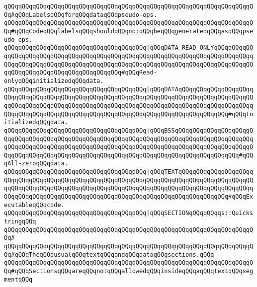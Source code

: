 \verb|qQQqqQQqqQQqqQQqqQQqqQQqqQQqqQQqqQQqqQQqqQQqqQQqqQQqqQQqqQQqqQQqqQQqqQQq#qQQqLabelsqQQqforqQQqdataqQQqpseudo-ops.|\newline
\verb|qQQqqQQqqQQqqQQqqQQqqQQqqQQqqQQqqQQqqQQqqQQqqQQqqQQqqQQqqQQqqQQqqQQqqQQq#qQQqCodeqQQqlabelsqQQqshouldqQQqnotqQQqbeqQQqgeneratedqQQqasqQQqpseudo-ops.|\newline
\newline
\verb|qQQqqQQqqQQqqQQqqQQqqQQqqQQqqQQqqQQqqQQq|\verb#|qQQqDATA_READ_ONLYqQQqqQQqqQQqqQQqqQQqqQQqqQQqqQQqqQQqqQQqqQQqqQQqqQQqqQQqqQQqqQQqqQQqqQQqqQQqqQQqqQQqqQQqqQQqqQQqqQQqqQQqqQQqqQQqqQQqqQQqqQQqqQQqqQQqqQQqqQQqqQQqqQQqqQQqqQQqqQQqqQQqqQQqqQQqqQQqqQQqqQQq#\verb|#qQQqRead-onlyqQQqinitializedqQQqdata.|\newline
\verb|qQQqqQQqqQQqqQQqqQQqqQQqqQQqqQQqqQQqqQQq|\verb#|qQQqDATAqQQqqQQqqQQqqQQqqQQqqQQqqQQqqQQqqQQqqQQqqQQqqQQqqQQqqQQqqQQqqQQqqQQqqQQqqQQqqQQqqQQqqQQqqQQqqQQqqQQqqQQqqQQqqQQqqQQqqQQqqQQqqQQqqQQqqQQqqQQqqQQqqQQqqQQqqQQqqQQqqQQqqQQqqQQqqQQqqQQqqQQqqQQqqQQqqQQqqQQqqQQqqQQqqQQqqQQqqQQqqQQq#\verb|#qQQqInitializedqQQqdata.|\newline
\verb|qQQqqQQqqQQqqQQqqQQqqQQqqQQqqQQqqQQqqQQq|\verb#|qQQqBSSqQQqqQQqqQQqqQQqqQQqqQQqqQQqqQQqqQQqqQQqqQQqqQQqqQQqqQQqqQQqqQQqqQQqqQQqqQQqqQQqqQQqqQQqqQQqqQQqqQQqqQQqqQQqqQQqqQQqqQQqqQQqqQQqqQQqqQQqqQQqqQQqqQQqqQQqqQQqqQQqqQQqqQQqqQQqqQQqqQQqqQQqqQQqqQQqqQQqqQQqqQQqqQQqqQQqqQQqqQQqqQQqqQQq#\verb|#qQQqAll-zeroqQQqdata.|\newline
\verb|qQQqqQQqqQQqqQQqqQQqqQQqqQQqqQQqqQQqqQQq|\verb#|qQQqTEXTqQQqqQQqqQQqqQQqqQQqqQQqqQQqqQQqqQQqqQQqqQQqqQQqqQQqqQQqqQQqqQQqqQQqqQQqqQQqqQQqqQQqqQQqqQQqqQQqqQQqqQQqqQQqqQQqqQQqqQQqqQQqqQQqqQQqqQQqqQQqqQQqqQQqqQQqqQQqqQQqqQQqqQQqqQQqqQQqqQQqqQQqqQQqqQQqqQQqqQQqqQQqqQQqqQQqqQQqqQQqqQQq#\verb|#qQQqExecutableqQQqcode.|\newline
\verb|qQQqqQQqqQQqqQQqqQQqqQQqqQQqqQQqqQQqqQQq|\verb#|qQQqSECTIONqQQqqQQqqs::QuickstringqQQq#\newline
\verb|qQQqqQQqqQQqqQQqqQQqqQQqqQQqqQQqqQQqqQQqqQQqqQQqqQQqqQQqqQQqqQQqqQQqqQQq#|\newline
\verb|qQQqqQQqqQQqqQQqqQQqqQQqqQQqqQQqqQQqqQQqqQQqqQQqqQQqqQQqqQQqqQQqqQQqqQQq#qQQqTheqQQqusualqQQqtextqQQqandqQQqdataqQQqsections.qQQq|\newline
\verb|qQQqqQQqqQQqqQQqqQQqqQQqqQQqqQQqqQQqqQQqqQQqqQQqqQQqqQQqqQQqqQQqqQQqqQQq#qQQqSectionsqQQqareqQQqnotqQQqallowedqQQqinsideqQQqaqQQqtextqQQqsegmentqQQq|\newline
\newline
\newline
